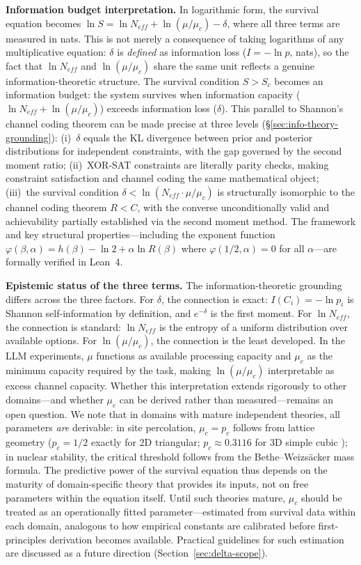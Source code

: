 \documentclass[11pt,a4paper]{article}
\begin{document}
\textbf{Information budget interpretation.} In logarithmic form, the survival equation becomes $\ln S = \ln N_{eff} + \ln(\mu/\mu_c) - \delta$, where all three terms are measured in nats. This is not merely a consequence of taking logarithms of any multiplicative equation: $\delta$ is \emph{defined} as information loss ($I = -\ln p$, nats), so the fact that $\ln N_{eff}$ and $\ln(\mu/\mu_c)$ share the same unit reflects a genuine information-theoretic structure. The survival condition $S > S_c$ becomes an information budget: the system survives when information capacity ($\ln N_{eff} + \ln(\mu/\mu_c)$) exceeds information loss ($\delta$). This parallel to Shannon's channel coding theorem \citep{shannon1948} can be made precise at three levels (\S\ref{sec:info-theory-grounding}): (i)~$\delta$ equals the KL divergence between prior and posterior distributions for independent constraints, with the gap governed by the second moment ratio; (ii)~XOR-SAT constraints are literally parity checks, making constraint satisfaction and channel coding the same mathematical object; (iii)~the survival condition $\delta < \ln(N_{eff} \cdot \mu/\mu_c)$ is structurally isomorphic to the channel coding theorem $R < C$, with the converse unconditionally valid and achievability partially established via the second moment method. The framework and key structural properties---including the exponent function $\varphi(\beta, \alpha) = h(\beta) - \ln 2 + \alpha \ln R(\beta)$ where $\varphi(1/2, \alpha) = 0$ for all $\alpha$---are formally verified in Lean~4.

\textbf{Epistemic status of the three terms.} The information-theoretic grounding differs across the three factors. For $\delta$, the connection is exact: $I(C_i) = -\ln p_i$ is Shannon self-information by definition, and $e^{-\delta}$ is the first moment. For $\ln N_{eff}$, the connection is standard: $\ln N_{eff}$ is the entropy of a uniform distribution over available options. For $\ln(\mu/\mu_c)$, the connection is the least developed. In the LLM experiments, $\mu$ functions as available processing capacity and $\mu_c$ as the minimum capacity required by the task, making $\ln(\mu/\mu_c)$ interpretable as excess channel capacity. Whether this interpretation extends rigorously to other domains---and whether $\mu_c$ can be derived rather than measured---remains an open question. We note that in domains with mature independent theories, all parameters \emph{are} derivable: in site percolation, $\mu_c = p_c$ follows from lattice geometry ($p_c = 1/2$ exactly for 2D triangular; $p_c \approx 0.3116$ for 3D simple cubic \citep{mertens2002exact}); in nuclear stability, the critical threshold follows from the Bethe--Weizs\"{a}cker mass formula. The predictive power of the survival equation thus depends on the maturity of domain-specific theory that provides its inputs, not on free parameters within the equation itself. Until such theories mature, $\mu_c$ should be treated as an operationally fitted parameter---estimated from survival data within each domain, analogous to how empirical constants are calibrated before first-principles derivation becomes available. Practical guidelines for such estimation are discussed as a future direction (Section~\ref{sec:delta-scope}).
\end{document}
